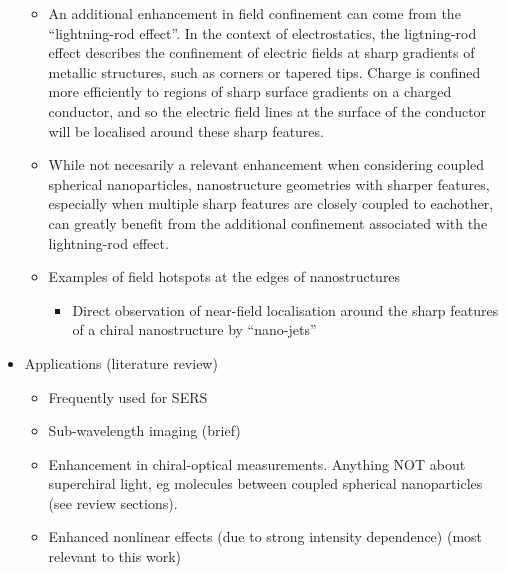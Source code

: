\begin{itemize}
\begin{itemize}
        \item An additional enhancement in field confinement can come from the ``lightning-rod effect''. In the context of electrostatics, the ligtning-rod effect describes the confinement of electric fields at sharp gradients of metallic structures, such as corners or tapered tips. Charge is confined more efficiently to regions of sharp surface gradients on a charged conductor, and so the electric field lines at the surface of the conductor will be localised around these sharp features.
        \item While not necesarily a relevant enhancement when considering coupled spherical nanoparticles, nanostructure geometries with sharper features, especially when multiple sharp features are closely coupled to eachother, can greatly benefit from the additional confinement associated with the lightning-rod effect.
        \item Examples of field hotspots at the edges of nanostructures
        \begin{itemize}
            \item Direct observation of near-field localisation around the sharp features of a chiral nanostructure by ``nano-jets''~\cite{Valev2012d}
        \end{itemize}
    \end{itemize}
    
    \item Applications (literature review)
    \begin{itemize}
        \item Frequently used for SERS
        \item Sub-wavelength imaging (brief)
        \item Enhancement in chiral-optical measurements. Anything NOT about superchiral light, eg molecules between coupled spherical nanoparticles (see review sections).
        \item Enhanced nonlinear effects (due to strong intensity dependence) (most relevant to this work)
    \end{itemize}
\end{itemize}

